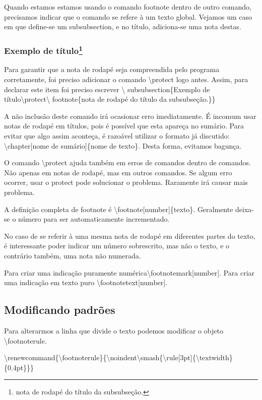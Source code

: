 Quando estamos estamos usando o comando footnote dentro de outro comando,
precisamos indicar que o comando se refere à um texto global.
Vejamos um caso em que define-se um subsubsection, e no título, adiciona-se uma
nota destas.

\subsubsection{Exemplo de título\protect\footnote{nota de rodapé do título da subsubseção.}}
Para garantir que a nota de rodapé seja compreendida pelo programa
corretamente, foi preciso adicionar o comando \textbackslash protect logo antes.
Assim, para declarar este item foi preciso escrever \textbackslash
subsubsection\{Exemplo de título\textbackslash protect\textbackslash
footnote\{nota de rodapé do título da subsubseção.\}\}

A não inclusão deste comando irá ocasionar erro imediatamente.  É incomum usar
notas de rodapé em títulos, pois é possível que esta apareça no sumário. Para
evitar que algo assim aconteça, é razoável utilizar o formato já discutido:
\textbackslash chapter[nome de sumário]\{nome de texto\}. Desta forma, evitamos
bagunça.

O comando \textbackslash protect ajuda também em erros de comandos dentro de
comandos. Não apenas em notas de rodapé, mas em outros comandos. Se algum erro
ocorrer, usar o protect pode solucionar o problema. Raramente irá causar mais
problema.

A definição completa de footnote é \textbackslash footnote[number]\{texto\}.
Geralmente deixa-se o número para ser automaticamente incrementado.

No caso de se referir à uma mesma nota de rodapé em diferentes partes do texto,
é interessante poder indicar um número sobrescrito, mas não o texto, e o
contrário também, uma nota não numerada.

Para criar uma indicação puramente numérica\footnotemark[42] \textbackslash footnotemark[number].
Para criar uma indicação em texto puro \textbackslash footnotetext[number].

\subsection{Modificando padrões}
Para alterarmos a linha que divide o texto podemos modificar o objeto \textbackslash footnoterule.

\textbackslash renewcommand\{\textbackslash footnoterule\}\{\textbackslash noindent\textbackslash smash\{\textbackslash rule[3pt]\{\textbackslash textwidth\}\{0.4pt\}\}\}

